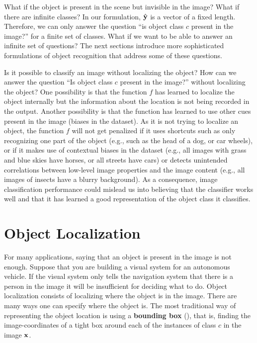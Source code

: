 What if the object is present in the scene but invisible in the image? What if there are infinite classes? In our formulation, $\hat {\bf y}$ is a vector of a fixed length. Therefore, we can only answer the question ``is object class $c$ present in the image?'' for a finite set of classes. What if we want to be able to answer an infinite set of questions? The next sections introduce more sophisticated formulations of object recognition that address some of these questions.


Is it possible to classify an image without localizing the object? How can we answer  the question ``Is object class $c$ present in the image?'' without localizing the object? One possibility is that the function $f$ has learned to localize the object internally but the information about the location is not being recorded in the output. Another possibility is that the function has learned to use other cues present in the image (biases in the dataset). As it is not trying to localize an object, the function $f$ will not get penalized if it uses shortcuts such as only recognizing one part of the object (e.g., such as the head of a dog, or car wheels), or if it makes use of contextual biases in the dataset (e.g., all images with grass and blue skies have horses, or all streets have cars) or detects unintended correlations between low-level image properties and the image content (e.g., all images of insects have a blurry background). As a consequence, image classification performance could mislead us into believing that the classifier works well and that it has learned a good representation of the object class it classifies. 




\section{Object Localization}

For many applications, saying that an object is present in the image is not enough. Suppose that you are building a visual system for an autonomous vehicle. If the visual system only tells the navigation system that there is a person in the image it will be insufficient for deciding what to do. Object localization consists of localizing where the object is in the image. There are many ways one can specify where the object is. The most traditional way of representing the object location is using a {\bf bounding box} (\fig{\ref{fig:object_detection_bb}}), that is, finding the image-coordinates of a tight box around each of the instances of class $c$ in the image $\bf x$.



